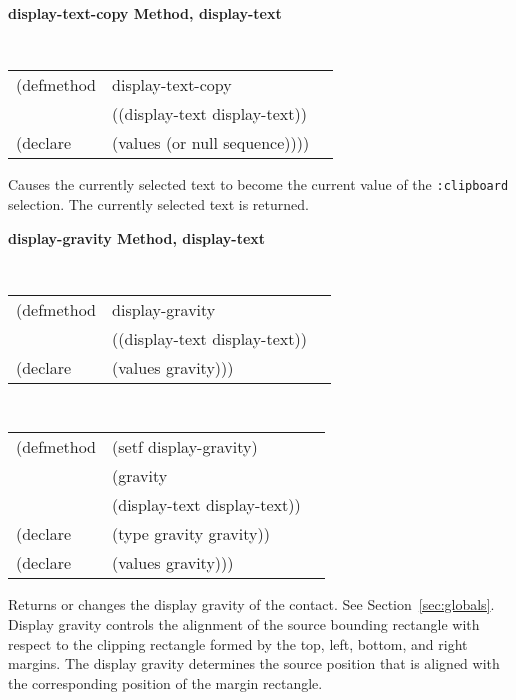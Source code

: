 {\samepage
{\large {\bf display-text-copy \hfill Method, display-text}}
\begin{flushright} \parbox[t]{6.125in}{
\tt
\begin{tabular}{lll}
\raggedright
(defmethod & display-text-copy & \\
           & ((display-text  display-text)) \\
(declare   & (values (or null sequence))))
\end{tabular}
\rm

}\end{flushright}}

\begin{flushright} \parbox[t]{6.125in}{
Causes the currently selected text to become the
current value of the {\tt :clipboard} selection. The currently selected text is returned. 

}\end{flushright}


{\samepage  
{\large {\bf display-gravity \hfill Method, display-text}}
\begin{flushright} \parbox[t]{6.125in}{
\tt
\begin{tabular}{lll}
\raggedright
(defmethod & display-gravity & \\
& ((display-text  display-text)) \\
(declare & (values gravity)))
\end{tabular}
\rm

}\end{flushright}}

\begin{flushright} \parbox[t]{6.125in}{
\tt
\begin{tabular}{lll}
\raggedright
(defmethod & (setf display-gravity) & \\
         & (gravity \\
         & (display-text  display-text)) \\
(declare &(type gravity  gravity))\\
(declare & (values gravity)))
\end{tabular}
\rm}
\end{flushright}

\begin{flushright} \parbox[t]{6.125in}{
Returns or changes the display gravity of the contact.
See Section~\ref{sec:globals}. Display gravity controls the alignment of the
source bounding rectangle with respect to the clipping rectangle formed by the
top, left, bottom, and right margins. The display gravity determines the source
position that is aligned with the corresponding position of the margin
rectangle.  
} \end{flushright}

